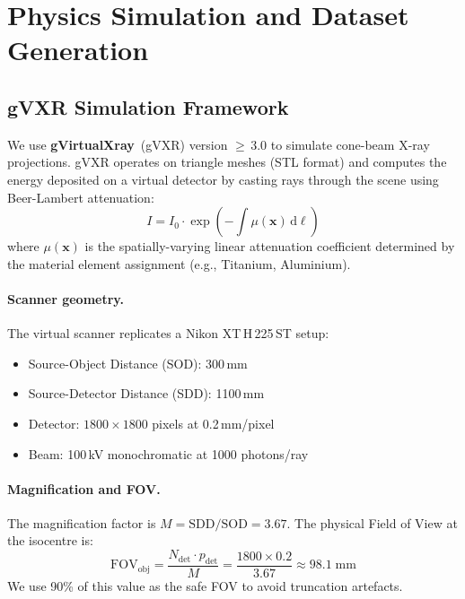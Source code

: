 \documentclass[10pt,twocolumn]{article}
\newcommand{\myvec}[1]{\bm{#1}}
\begin{document}
\section{Physics Simulation and Dataset Generation}
\label{sec:data}

\subsection{gVXR Simulation Framework}

We use \textbf{gVirtualXray}~(gVXR) version $\geq$\,3.0 to simulate
cone-beam X-ray projections.
gVXR operates on triangle meshes (STL format) and computes the
energy deposited on a virtual detector by casting rays through the
scene using Beer-Lambert attenuation:
\begin{equation}
    I = I_0 \cdot \exp\!\left(-\int \mu(\myvec{x})\,\mathrm{d}\ell\right)
    \label{eq:beer}
\end{equation}
where $\mu(\myvec{x})$ is the spatially-varying linear attenuation
coefficient determined by the material element assignment
(e.g., Titanium, Aluminium).

\paragraph{Scanner geometry.}
The virtual scanner replicates a Nikon XT\,H\,225\,ST setup:
\begin{itemize}[leftmargin=*,noitemsep]
    \item Source-Object Distance (SOD): 300\,mm
    \item Source-Detector Distance (SDD): 1100\,mm
    \item Detector: $1800 \times 1800$ pixels at 0.2\,mm/pixel
    \item Beam: 100\,kV monochromatic at 1000 photons/ray
\end{itemize}

\paragraph{Magnification and FOV.}
The magnification factor is $M = \mathrm{SDD}/\mathrm{SOD} = 3.67$.
The physical Field of View at the isocentre is:
\begin{equation}
    \mathrm{FOV}_{\mathrm{obj}} = \frac{N_{\mathrm{det}} \cdot p_{\mathrm{det}}}{M}
    = \frac{1800 \times 0.2}{3.67} \approx 98.1\;\mathrm{mm}
    \label{eq:fov}
\end{equation}
We use 90\% of this value as the safe FOV to avoid truncation artefacts.
\end{document}
